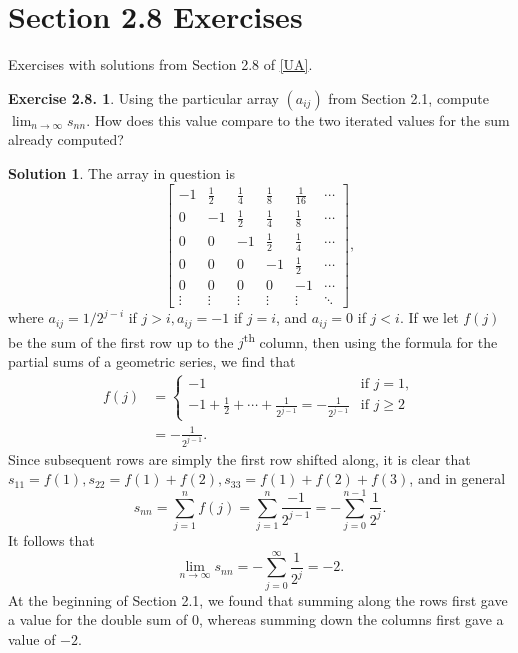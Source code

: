 \documentclass[12pt]{article}
\theoremstyle{definition}
\theoremstyle{exercise}
\newtheorem{exercise}{Exercise 2.8.}
\theoremstyle{solution}
\newtheorem*{solution}{Solution}
\newcommand{\ts}{\textsuperscript}
\begin{document}
\section{Section 2.8 Exercises}

Exercises with solutions from Section 2.8 of \hyperlink{ua}{[UA]}.

\begin{exercise}
\label{ex:1}
    Using the particular array \( (a_{ij}) \) from Section 2.1, compute \( \lim_{n \to \infty} s_{nn} \). How does this value compare to the two iterated values for the sum already computed?
\end{exercise}

\begin{solution}
    The array in question is
    \[
        \begin{bmatrix}
            -1 & \tfrac{1}{2} & \tfrac{1}{4} & \tfrac{1}{8} & \tfrac{1}{16} & \cdots \\[3mm]
            0 & -1 & \tfrac{1}{2} & \tfrac{1}{4} & \tfrac{1}{8} & \cdots \\[3mm]
            0 & 0 & -1 & \tfrac{1}{2} & \tfrac{1}{4} & \cdots \\[3mm]
            0 & 0 & 0 & -1 & \tfrac{1}{2} & \cdots \\[3mm]
            0 & 0 & 0 & 0 & -1 & \cdots \\[1mm]
            \vdots & \vdots & \vdots & \vdots & \vdots & \ddots
        \end{bmatrix},
    \]
    where \( a_{ij} = 1 / 2^{j-i} \) if \( j > i, a_{ij} = -1 \) if \( j = i \), and \( a_{ij} = 0 \) if \( j < i \). If we let \( f(j) \) be the sum of the first row up to the \( j \)\ts{th} column, then using the formula for the partial sums of a geometric series, we find that
    \begin{align*}
        f(j) &= \begin{cases}
            -1 & \text{if } j = 1, \\
            -1 + \tfrac{1}{2} + \cdots + \tfrac{1}{2^{j-1}} = -\tfrac{1}{2^{j-1}} & \text{if } j \geq 2
        \end{cases} \\[2mm]
        &= -\frac{1}{2^{j-1}}.
    \end{align*}
    Since subsequent rows are simply the first row shifted along, it is clear that \( s_{11} = f(1), s_{22} = f(1) + f(2), s_{33} = f(1) + f(2) + f(3) \), and in general
    \[
        s_{nn} = \sum_{j=1}^n f(j) = \sum_{j=1}^n \frac{-1}{2^{j-1}} = -\sum_{j=0}^{n-1} \frac{1}{2^j}.
    \]
    It follows that
    \[
        \lim_{n \to \infty} s_{nn} = -\sum_{j=0}^{\infty} \frac{1}{2^j} = -2.
    \]
    At the beginning of Section 2.1, we found that summing along the rows first gave a value for the double sum of \( 0 \), whereas summing down the columns first gave a value of \( -2 \).
\end{solution}
\end{document}
